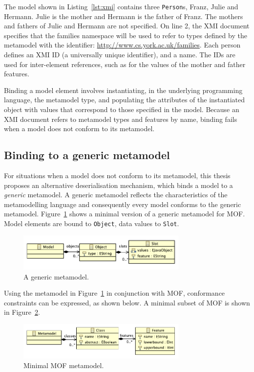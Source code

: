 The model shown in Listing~\ref{lst:xmi} contains three \texttt{Person}s, Franz, Julie and Hermann. Julie is the mother and Hermann is the father of Franz. The mothers and fathers of Julie and Hermann are not specified. On line 2, the XMI document specifies that the families namespace will be used to refer to types defined by the metamodel with the identifier: \url{http://www.cs.york.ac.uk/families}. Each person defines an XMI ID (a universally unique identifier), and a name. The IDs are used for inter-element references, such as for the values of the mother and father features.

Binding a model element involves instantiating, in the underlying programming language, the metamodel type, and populating the attributes of the instantiated object with values that correspond to those specified in the model. Because an XMI document refers to metamodel types and features by name, binding fails when a model does not conform to its metamodel. 


\subsection{Binding to a generic metamodel}
\label{subsec:binding}
For situations when a model does not conform to its metamodel, this thesis proposes an alternative deserialisation mechanism, which binds a model to a \emph{generic} metamodel. A generic metamodel reflects the characteristics of the metamodelling language and consequently every model conforms to the generic metamodel. Figure~\ref{fig:slot_model} shows a minimal version of a generic metamodel for MOF. Model elements are bound to \texttt{Object}, data values to \texttt{Slot}.

\begin{figure}[htbp]
  \centering
  \includegraphics[width=3.3in]{5.Implementation/slot_model.pdf}
  \caption{A generic metamodel.}
  \label{fig:slot_model}
\end{figure}

Using the metamodel in Figure~\ref{fig:slot_model} in conjunction with MOF, conformance constraints can be expressed, as shown below. A minimal subset of MOF is shown in Figure~\ref{fig:minimal_mof}.

\begin{figure}[htbp]
  \centering
  \includegraphics[width=3.3in]{5.Implementation/mof.pdf}
  \caption{Minimal MOF metamodel.}
  \label{fig:minimal_mof}
\end{figure}

